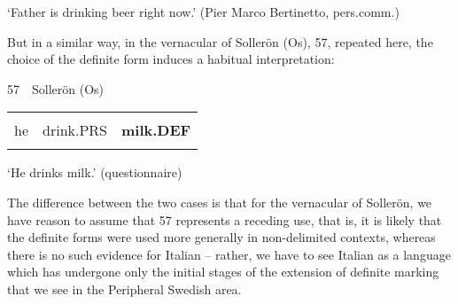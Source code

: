 \begin{styleTranslation}
‘Father is drinking beer right now.’ (Pier Marco Bertinetto, pers.comm.)

\end{styleTranslation}

\begin{styleBodyTextFirst}
But in a similar way, in the vernacular of Sollerön (Os), 57, repeated here, the choice of the definite form induces a habitual interpretation:

\end{styleBodyTextFirst}

\begin{styleRepeatedexample}
57\ \ Sollerön (Os) 

\end{styleRepeatedexample}

\begin{tabular}{lll}
\lsptoprule
\multicolumn{3}{l}{An

}\\
he & drink.PRS & {\bfseries milk.DEF}\\
\lspbottomrule
\end{tabular}

\begin{styleTranslation}
‘He drinks milk.’ (questionnaire)

\end{styleTranslation}

\begin{styleBodyTextFirst}
The difference between the two cases is that for the vernacular of Sollerön, we have reason to assume that 57 represents a receding use, that is, it is likely that the definite forms were used more generally in non-delimited contexts, whereas there is no such evidence for Italian – rather, we have to see Italian as a language which has undergone only the initial stages of the extension of definite marking that we see in the Peripheral Swedish area. 

\end{styleBodyTextFirst}


